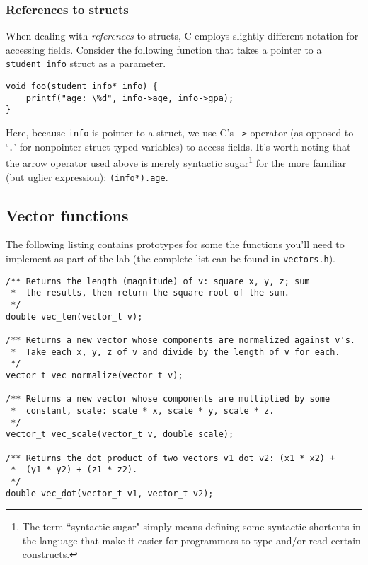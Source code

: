 \documentclass[12pt]{article}
\begin{document}
\subsubsection{References to structs}

When dealing with \textit{references} to structs, C employs slightly different notation for accessing fields. Consider the following function that takes a pointer to a \texttt{student\_info} struct as a parameter.

\begin{mdframed}[backgroundcolor=light-gray, innerleftmargin=10, innertopmargin=1,innerbottommargin=1,linecolor=light-gray]
\begin{lstlisting}
void foo(student_info* info) {
    printf("age: \%d", info->age, info->gpa);
}
\end{lstlisting}
\end{mdframed}

Here, because \texttt{info} is pointer to a struct, we use C's \texttt{->} operator (as opposed to `\texttt{.}' for nonpointer struct-typed variables) to access fields. It's worth noting that the arrow operator used above is merely syntactic sugar\footnote{The term ``syntactic sugar" simply means defining some syntactic shortcuts in the language that make it easier for programmars to type and/or read certain constructs.} for the more familiar (but uglier expression): \texttt{(info*).age}. 

\newpage
\subsection{Vector functions}

The following listing contains prototypes for some the functions you'll need to implement as part of the lab (the complete list can be found in \texttt{vectors.h}).

\begin{mdframed}[backgroundcolor=light-gray, innerleftmargin=10, innertopmargin=1,innerbottommargin=1,linecolor=light-gray]
\begin{lstlisting}
/** Returns the length (magnitude) of v: square x, y, z; sum
 *  the results, then return the square root of the sum.
 */
double vec_len(vector_t v);

/** Returns a new vector whose components are normalized against v's.
 *  Take each x, y, z of v and divide by the length of v for each.
 */
vector_t vec_normalize(vector_t v);

/** Returns a new vector whose components are multiplied by some 
 *  constant, scale: scale * x, scale * y, scale * z.
 */
vector_t vec_scale(vector_t v, double scale);
    
/** Returns the dot product of two vectors v1 dot v2: (x1 * x2) + 
 *  (y1 * y2) + (z1 * z2).
 */
double vec_dot(vector_t v1, vector_t v2);
\end{lstlisting}
\end{mdframed}
\end{document}

